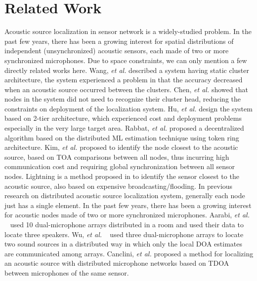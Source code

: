 \section{Related Work}

Acoustic source localization in sensor network is a widely-studied problem. 
In the past few years, there has been a growing interest for spatial distributions of independent (unsynchronized) acoustic sensors, each made of two or more synchronized microphones. Due to space constraints, we can only mention a few directly related works here.
Wang, \emph{et al.} \cite{wang2003acoustic} described a system having static cluster architecture, the system experienced a problem in that the accuracy decreased when an acoustic source occurred between the clusters.
Chen, \emph{et al.} \cite{chen2004dynamic} showed that nodes in the system did not need to recognize their cluster head, reducing the constraints on deployment of the localization system.
Hu, \emph{et al.} \cite{hu2009design} design the system based on 2-tier architecture, which experienced cost and deployment problems especially in the very large target area.
Rabbat, \emph{et al.} \cite{rabbat2005robust} proposed a decentralized algorithm based on the distributed ML estimation technique using token ring architecture.
Kim, \emph{et al.} \cite{kim2009locating} proposed to identify the node closest to the acoustic source, based on TOA comparisons between all nodes, thus incurring high communication cost and requiring global synchronization between all sensor nodes.
Lightning is a method proposed in \cite{wang2008lightning} to identify the sensor closest to the acoustic source, also based on expensive broadcasting/flooding.
In previous research on distributed acoustic source localization system, generally each node just has a single element. 
In the past few years, there has been a growing interest for acoustic nodes made of two or more synchronized microphones. 
Aarabi, \emph{et al.} ~\cite{aarabi1900fusion} used 10 dual-microphone arrays distributed in a room and used their data to locate three speakers.
Wu, \emph{et al.} ~\cite{wu2012fusion} used three dual-microphone arrays to locate two sound sources in a distributed way in which only the local DOA estimates are communicated among arrays.
Canclini, \emph{et al.}\cite{canclini2013acoustic,Canclini2015} proposed a method for localizing an acoustic source with distributed microphone networks based on TDOA between microphones of the same sensor.

